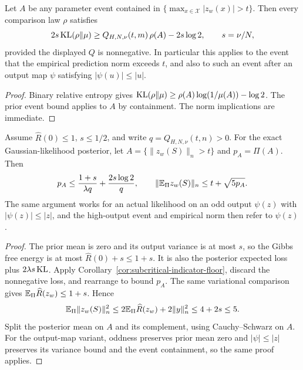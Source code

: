 \begin{corollary}
\label{cor:subcritical-indicator-floor}
Let $A$ be any parameter event contained in
$\{\max_{x\in\mathcal X}|z_w(x)|>t\}$. Then every comparison law $\rho$ satisfies
\[
 2s\operatorname{KL}(\rho\|\mu)
 \ge Q_{H,N,\nu}(t,m)\,\rho(A)-2s\log2,
 \qquad s=\nu/N,
\]
provided the displayed $Q$ is nonnegative. In particular this applies to the event that the empirical prediction norm exceeds $t$, and also to such an event after an output map $\psi$ satisfying $|\psi(u)|\le|u|$.
\end{corollary}
\begin{proof}
Binary relative entropy gives
$\operatorname{KL}(\rho\|\mu)\ge\rho(A)\log(1/\mu(A))-\log2$.
The prior event bound applies to $A$ by containment. The norm implications are immediate.
\end{proof}

\begin{lemma}
\label{lem:subcritical-high-temperature}
Assume $\widehat R(0)\le1$, $s\le1/2$, and write $q=Q_{H,N,\nu}(t,n)>0$. For the exact Gaussian-likelihood posterior, let $A=\{\|z_w(S)\|_n>t\}$ and $p_A=\Pi(A)$. Then
\[
 p_A\le\frac{1+s}{\lambda q}+\frac{2s\log2}{q},
 \qquad
 \|\mathbb E_\Pi z_w(S)\|_n\le t+\sqrt{5p_A}.
\]
The same argument works for an actual likelihood on an odd output $\psi(z)$ with $|\psi(z)|\le|z|$, and the high-output event and empirical norm then refer to $\psi(z)$.
\end{lemma}
\begin{proof}
The prior mean is zero and its output variance is at most $s$, so the Gibbs free energy is at most $\widehat R(0)+s\le1+s$. It is also the posterior expected loss plus $2\lambda s\operatorname{KL}$. Apply Corollary~\ref{cor:subcritical-indicator-floor}, discard the nonnegative loss, and rearrange to bound $p_A$.
The same variational comparison gives $\mathbb E_\Pi\widehat R(z_w)\le1+s$. Hence
\[
 \mathbb E_\Pi\|z_w(S)\|_n^2
 \le2\mathbb E_\Pi\widehat R(z_w)+2\|y\|_n^2\le4+2s\le5.
\]
Split the posterior mean on $A$ and its complement, using Cauchy--Schwarz on $A$. For the output-map variant, oddness preserves prior mean zero and $|\psi|\le|z|$ preserves its variance bound and the event containment, so the same proof applies.
\end{proof}
